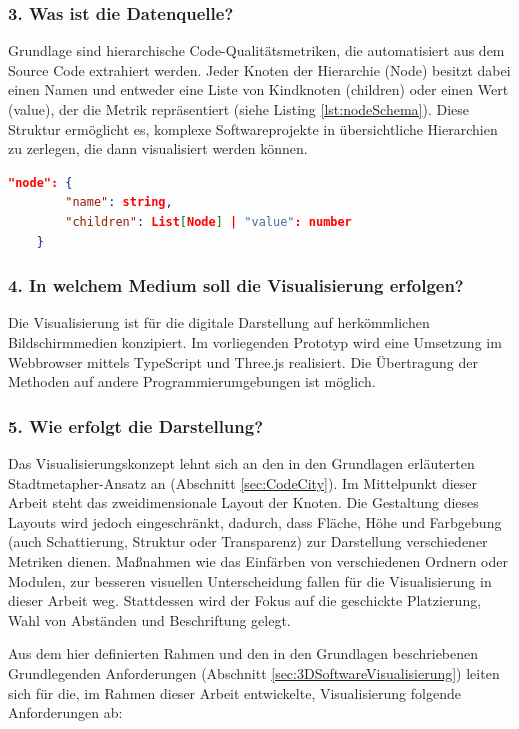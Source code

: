 \subsubsection*{3. Was ist die Datenquelle?}
Grundlage sind hierarchische Code-Qualitätsmetriken, die automatisiert aus dem Source Code extrahiert werden. Jeder Knoten der Hierarchie (Node) besitzt dabei einen Namen und entweder eine Liste von Kindknoten (children) oder einen Wert (value), der die Metrik repräsentiert (siehe Listing \ref{lst:nodeSchema}). 
Diese Struktur ermöglicht es, komplexe Softwareprojekte in übersichtliche Hierarchien zu zerlegen, die dann visualisiert werden können.

\begin{lstlisting}[language=json, caption={Schema einer Node}, label={lst:nodeSchema}]
    "node": {
        "name": string,
        "children": List[Node] | "value": number
    }
\end{lstlisting}

\subsubsection*{4. In welchem Medium soll die Visualisierung erfolgen?}
Die Visualisierung ist für die digitale Darstellung auf herkömmlichen Bildschirmmedien konzipiert. Im vorliegenden Prototyp wird eine Umsetzung im Webbrowser mittels TypeScript und Three.js realisiert. Die Übertragung der Methoden auf andere Programmierumgebungen ist möglich.

\subsubsection*{5. Wie erfolgt die Darstellung?}
Das Visualisierungskonzept lehnt sich an den in den Grundlagen erläuterten Stadtmetapher-Ansatz an (Abschnitt \ref{sec:CodeCity}). Im Mittelpunkt dieser Arbeit steht das zweidimensionale Layout der Knoten. Die Gestaltung dieses Layouts wird jedoch eingeschränkt, dadurch, dass Fläche, Höhe und Farbgebung (auch Schattierung, Struktur oder Transparenz) zur Darstellung verschiedener Metriken dienen. Maßnahmen wie das Einfärben von verschiedenen Ordnern oder Modulen, zur besseren visuellen Unterscheidung fallen für die Visualisierung in dieser Arbeit weg. Stattdessen wird der Fokus auf die geschickte Platzierung, Wahl von Abständen und Beschriftung gelegt. 

\smallskip

Aus dem hier definierten Rahmen und den in den Grundlagen beschriebenen Grundlegenden Anforderungen (Abschnitt \ref{sec:3DSoftwareVisualisierung}) leiten sich für die, im Rahmen dieser Arbeit entwickelte, Visualisierung folgende Anforderungen ab:

